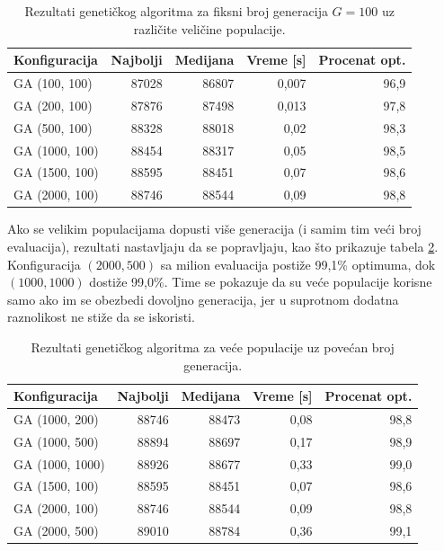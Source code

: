 \documentclass[12pt]{article}
\begin{document}
\begin{table}[H]
\centering
\begin{tabular}{|l|r|r|r|r|}
\hline
Konfiguracija & Najbolji & Medijana & Vreme [s] & Procenat opt. \\ \hline
GA (100, 100)    & 87028 & 86807 & 0,007 & 96,9 \\ \hline
GA (200, 100)    & 87876 & 87498 & 0,013 & 97,8 \\ \hline
GA (500, 100)   & 88328 & 88018 & 0,02  & 98,3 \\ \hline
GA (1000, 100)  & 88454 & 88317 & 0,05  & 98,5 \\ \hline
GA (1500, 100)  & 88595 & 88451 & 0,07  & 98,6 \\ \hline
GA (2000, 100)  & 88746 & 88544 & 0,09  & 98,8 \\ \hline
\end{tabular}
\caption{Rezultati genetičkog algoritma za fiksni broj generacija $G = 100$ uz različite veličine populacije.}
\label{tab:r10-fixG}
\end{table}

Ako se velikim populacijama dopusti više generacija (i samim tim veći broj evaluacija), rezultati nastavljaju da se popravljaju, kao što prikazuje tabela \ref{tab:r10-bigP}. Konfiguracija $(2000, 500)$ sa milion evaluacija postiže 99,1\% optimuma, dok $(1000, 1000)$ dostiže 99,0\%. Time se pokazuje da su veće populacije korisne samo ako im se obezbedi dovoljno generacija, jer u suprotnom dodatna raznolikost ne stiže da se iskoristi.

\begin{table}[H]
\centering
\begin{tabular}{|l|r|r|r|r|}
\hline
Konfiguracija & Najbolji & Medijana & Vreme [s] & Procenat opt. \\ \hline
GA (1000, 200)   & 88746 & 88473 & 0,08 & 98,8 \\ \hline
GA (1000, 500)   & 88894 & 88697 & 0,17 & 98,9 \\ \hline
GA (1000, 1000)  & 88926 & 88677 & 0,33 & 99,0 \\ \hline
GA (1500, 100)   & 88595 & 88451 & 0,07 & 98,6 \\ \hline
GA (2000, 100)   & 88746 & 88544 & 0,09 & 98,8 \\ \hline
GA (2000, 500)   & 89010 & 88784 & 0,36 & 99,1 \\ \hline
\end{tabular}
\caption{Rezultati genetičkog algoritma za veće populacije uz povećan broj generacija.}
\label{tab:r10-bigP}
\end{table}
\end{document}
